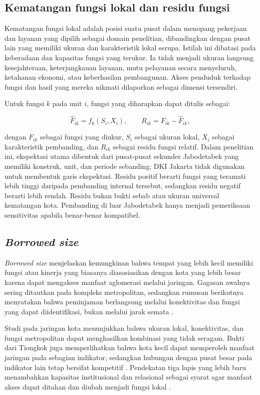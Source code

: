 \documentclass[11pt,a4paper,oneside,openany,indonesian]{report}
\begin{document}
\subsection{Kematangan fungsi lokal dan residu fungsi}

Kematangan fungsi lokal adalah posisi suatu pusat dalam menopang pekerjaan dan layanan yang dipilih sebagai domain penelitian, dibandingkan dengan pusat lain yang memiliki ukuran dan karakteristik lokal serupa. Istilah ini dibatasi pada keberadaan dan kapasitas fungsi yang terukur. Ia tidak menjadi ukuran langsung kesejahteraan, keterjangkauan layanan, mutu pelayanan secara menyeluruh, ketahanan ekonomi, atau keberhasilan pembangunan. Akses penduduk terhadap fungsi dan hasil yang mereka nikmati dilaporkan sebagai dimensi tersendiri.

Untuk fungsi $k$ pada unit $i$, fungsi yang diharapkan dapat ditulis sebagai:

\[
\widehat{F}_{ik}=f_k(S_i,X_i), \qquad R_{ik}=F_{ik}-\widehat{F}_{ik},
\]

\noindent dengan $F_{ik}$ sebagai fungsi yang diukur, $S_i$ sebagai ukuran lokal, $X_i$ sebagai karakteristik pembanding, dan $R_{ik}$ sebagai residu fungsi relatif. Dalam penelitian ini, ekspektasi utama dibentuk dari pusat-pusat sekunder Jabodetabek yang memiliki konstruk, unit, dan periode sebanding; DKI Jakarta tidak digunakan untuk membentuk garis ekspektasi. Residu positif berarti fungsi yang teramati lebih tinggi daripada pembanding internal tersebut, sedangkan residu negatif berarti lebih rendah. Residu bukan bukti sebab atau ukuran universal kematangan kota. Pembanding di luar Jabodetabek hanya menjadi pemeriksaan sensitivitas apabila benar-benar kompatibel.

\subsection{\textit{Borrowed size}}

\textit{Borrowed size} menjelaskan kemungkinan bahwa tempat yang lebih kecil memiliki fungsi atau kinerja yang biasanya diasosiasikan dengan kota yang lebih besar karena dapat mengakses manfaat aglomerasi melalui jaringan. Gagasan awalnya sering ditautkan pada kompleks metropolitan, sedangkan rumusan berikutnya menyatakan bahwa peminjaman berlangsung melalui konektivitas dan fungsi yang dapat diidentifikasi, bukan melalui jarak semata \parencite{meijersburger2017,meijersetal2016,burgeretal2015}.

Studi pada jaringan kota menunjukkan bahwa ukuran lokal, konektivitas, dan fungsi metropolitan dapat menghasilkan kombinasi yang tidak seragam. Bukti dari Tiongkok juga memperlihatkan bahwa kota kecil dapat memperoleh manfaat jaringan pada sebagian indikator, sedangkan hubungan dengan pusat besar pada indikator lain tetap bersifat kompetitif \parencite{yangzhudu2022,zhaomiaoxi2022}. Pendekatan tiga lapis yang lebih baru menambahkan kapasitas institusional dan relasional sebagai syarat agar manfaat akses dapat ditahan dan diubah menjadi fungsi lokal \parencite{otsuka2025}.
\end{document}
